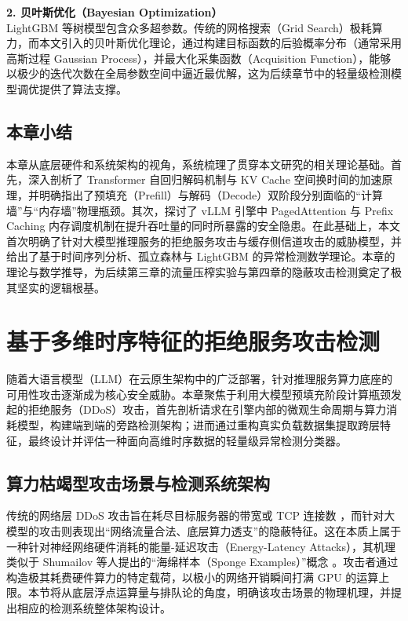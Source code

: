 \documentclass[master, vlined]{DissertUESTC}
\begin{document}
	\textbf{2. 贝叶斯优化（Bayesian Optimization）} \\
	LightGBM 等树模型包含众多超参数。传统的网格搜索（Grid Search）极耗算力，而本文引入的贝叶斯优化理论，通过构建目标函数的后验概率分布（通常采用高斯过程 Gaussian Process），并最大化采集函数（Acquisition Function），能够以极少的迭代次数在全局参数空间中逼近最优解，这为后续章节中的轻量级检测模型调优提供了算法支撑。

	\section{本章小结}
	本章从底层硬件和系统架构的视角，系统梳理了贯穿本文研究的相关理论基础。首先，深入剖析了 Transformer 自回归解码机制与 KV Cache 空间换时间的加速原理，并明确指出了预填充（Prefill）与解码（Decode）双阶段分别面临的“计算墙”与“内存墙”物理瓶颈。其次，探讨了 vLLM 引擎中 PagedAttention 与 Prefix Caching 内存调度机制在提升吞吐量的同时所暴露的安全隐患。在此基础上，本文首次明确了针对大模型推理服务的拒绝服务攻击与缓存侧信道攻击的威胁模型，并给出了基于时间序列分析、孤立森林与 LightGBM 的异常检测数学理论。本章的理论与数学推导，为后续第三章的流量压榨实验与第四章的隐蔽攻击检测奠定了极其坚实的逻辑根基。



\chapter{基于多维时序特征的拒绝服务攻击检测}

	随着大语言模型（LLM）在云原生架构中的广泛部署，针对推理服务算力底座的可用性攻击逐渐成为核心安全威胁。本章聚焦于利用大模型预填充阶段计算瓶颈发起的拒绝服务（DDoS）攻击，首先剖析请求在引擎内部的微观生命周期与算力消耗模型，构建端到端的旁路检测架构；进而通过重构真实负载数据集提取跨层特征，最终设计并评估一种面向高维时序数据的轻量级异常检测分类器。

\section{算力枯竭型攻击场景与检测系统架构}

	传统的网络层 DDoS 攻击旨在耗尽目标服务器的带宽或 TCP 连接数 \cite{针对分布式拒绝服务泛洪攻击的防御机制综述}，而针对大模型的攻击则表现出“网络流量合法、底层算力透支”的隐蔽特征。这在本质上属于一种针对神经网络硬件消耗的能量-延迟攻击（Energy-Latency Attacks），其机理类似于 Shumailov 等人提出的“海绵样本（Sponge Examples）”概念 \cite{海绵样本针对神经网络的能量与延迟攻击}。攻击者通过构造极其耗费硬件算力的特定载荷，以极小的网络开销瞬间打满 GPU 的运算上限。本节将从底层浮点运算量与排队论的角度，明确该攻击场景的物理机理，并提出相应的检测系统整体架构设计。
\end{document}
